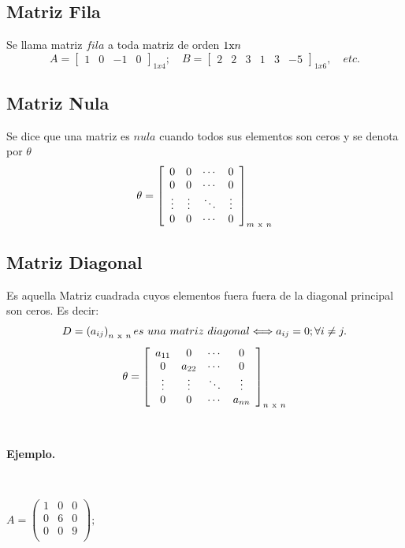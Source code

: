 \documentclass[11pt, conference]{IEEEtran}
\begin{document}
{\subsection{Matriz Fila}
Se llama matriz $fila$ a toda matriz de orden $1 \textnormal{x} n$
\[
	A = \left[
	\begin{array}{cccc}
    	1 & 0 & -1 & 0
    \end{array}
    \right]_{1x4};\quad
    B = \left[
	\begin{array}{cccccc}
    	2 & 2 & 3 & 1 & 3 & -5
    \end{array}
	\right]_{1x6},\quad etc.
\]
\subsection{Matriz Nula}
Se dice que una matriz es $nula$ cuando todos sus elementos son ceros y se denota por $\theta$
\[
	\theta = \left[
  \begin{array}{cccc}
  0 & 0 & \cdots & 0 \\
  0 & 0 & \cdots & 0 \\
  \vdots & \vdots &\ddots & \vdots \\
  0 & 0 & \cdots & 0 \\
  \end{array} \right]_{m\ \textnormal{x}\ n}
\]
\subsection{Matriz Diagonal}
Es aquella Matriz cuadrada cuyos elementos fuera fuera de la diagonal principal son ceros. Es decir:
\[
	D = \left(a_{ij}\right)_{n\ \textnormal{x}\ n} es\ una\ matriz\ diagonal \Longleftrightarrow a_{ij} = 0;\forall i \not = j.
\]
\[
	\theta = \left[
  \begin{array}{cccc}
  a_{11} & 0 & \cdots & 0 \\
  0 & a_{22} & \cdots & 0 \\
  \vdots & \vdots &\ddots & \vdots \\
  0 & 0 & \cdots & a_{nn} \\
  \end{array} \right]_{n\ \textnormal{x}\ n}
\]

\

\textbf{Ejemplo.}

\

$
	A = \left(
    \begin{array}{ccc}
    	1 & 0 & 0 \\
        0 & 6 & 0 \\
        0 & 0 & 9 \\
    \end{array}
    \right);\qquad
$    

}
\end{document}
